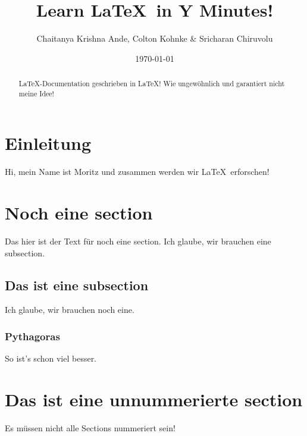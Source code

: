 \documentclass[12pt]{article}
\author{Chaitanya Krishna Ande, Colton Kohnke \& Sricharan Chiruvolu}
\date{\today}
\title{Learn \LaTeX\ in Y Minutes!}
\newcommand{\comment}[1]{}
\begin{document}
\comment{
  Dies ist unser selbst-definierter Befehl
  für mehrzeilige Kommentare.
}

\maketitle

\begin{abstract}
 \LaTeX -Documentation geschrieben in \LaTeX ! Wie ungewöhnlich und garantiert nicht meine Idee!
\end{abstract}

\section{Einleitung}
Hi, mein Name ist Moritz und zusammen werden wir \LaTeX\ erforschen!

\section{Noch eine section}
Das hier ist der Text für noch eine section. Ich glaube, wir brauchen eine subsection.

\subsection{Das ist eine subsection} %
Ich glaube, wir brauchen noch eine.

\subsubsection{Pythagoras}
So ist's schon viel besser.
\label{subsec:pythagoras}

\section*{Das ist eine unnummerierte section}
Es müssen nicht alle Sections nummeriert sein!
\end{document}
